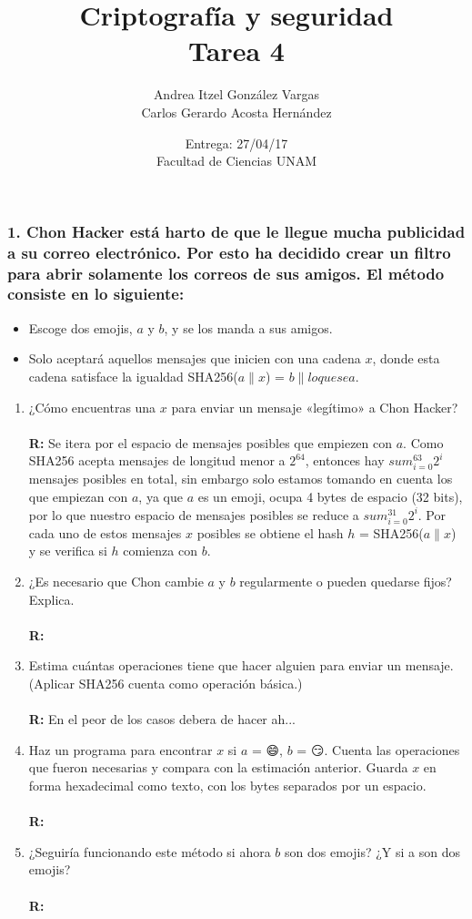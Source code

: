 \documentclass[14pt]{article}
\title{Criptografía y seguridad \\ Tarea 4}
\author{Andrea Itzel González Vargas \\ Carlos Gerardo Acosta Hernández}
\date{Entrega: 27/04/17 \\ Facultad de Ciencias UNAM}
\begin{document}
\maketitle

\subsubsection*{1. Chon Hacker está harto de que le llegue mucha publicidad a su correo electrónico. Por esto ha decidido crear un filtro para abrir solamente los correos de sus amigos. El método consiste en lo siguiente:}
\begin{itemize}
\item Escoge dos emojis, $a$ y $b$, y se los manda a sus amigos.
\item Solo aceptará aquellos mensajes que inicien con una cadena $x$, donde esta cadena satisface la igualdad SHA256($a \parallel x$) = $b \parallel loquesea$.
\end{itemize}

\begin{enumerate}[label=\alph*)]
\item ¿Cómo encuentras una $x$ para enviar un mensaje «legítimo» a Chon Hacker? \\ \\
\textbf{R:} Se itera por el espacio de mensajes posibles que empiezen con $a$. Como SHA256 acepta mensajes de longitud menor a $2^{64}$, entonces hay $sum_{i = 0}^{63} 2^i$ mensajes posibles en total, sin embargo solo estamos tomando en cuenta los que empiezan con $a$, ya que $a$ es un emoji, ocupa 4 bytes de espacio (32 bits), por lo que nuestro espacio de mensajes posibles se reduce a $sum_{i = 0}^{31} 2^i$. Por cada uno de estos mensajes $x$ posibles se obtiene el hash $h$ = SHA256($a \parallel x$)  y se verifica si $h$ comienza con $b$.

\item ¿Es necesario que Chon cambie $a$ y $b$ regularmente o pueden quedarse fijos? Explica. \\ \\
  \textbf{R:} 
  
\item Estima cuántas operaciones tiene que hacer alguien para enviar un mensaje. (Aplicar SHA256 cuenta como operación básica.) \\ \\
  \textbf{R:} En el peor de los casos debera de hacer ah...
  
\item Haz un programa para encontrar $x$ si $a$ = 😄, $b$ = 😏. Cuenta las operaciones que fueron necesarias y compara con la estimación anterior. Guarda $x$ en forma hexadecimal como texto, con los bytes separados por un espacio. \\ \\
  \textbf{R:}
  
\item ¿Seguiría funcionando este método si ahora $b$ son dos emojis? ¿Y si a son dos emojis? \\ \\
  \textbf{R:}
\end{enumerate}
\end{document}
